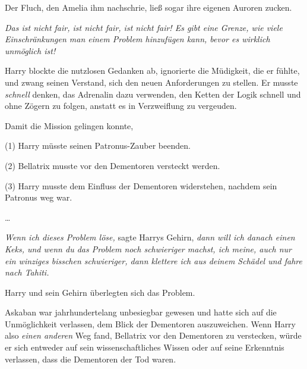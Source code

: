 Der Fluch, den Amelia ihm nachschrie, ließ sogar ihre eigenen Auroren zucken.

\later

\emph{Das ist nicht fair, ist nicht fair, ist nicht fair! Es gibt eine Grenze, wie viele Einschränkungen man einem Problem hinzufügen kann, bevor es wirklich unmöglich ist!}

Harry blockte die nutzlosen Gedanken ab, ignorierte die Müdigkeit, die er fühlte, und zwang seinen Verstand, sich den neuen Anforderungen zu stellen. Er musste \emph{schnell} denken, das Adrenalin dazu verwenden, den Ketten der Logik schnell und ohne Zögern zu folgen, anstatt es in Verzweiflung zu vergeuden.

Damit die Mission gelingen konnte,

(1) Harry müsste seinen Patronus-Zauber beenden.

(2) Bellatrix musste vor den Dementoren versteckt werden.

(3) Harry musste dem Einfluss der Dementoren widerstehen, nachdem sein Patronus weg war.

…

\emph{Wenn ich dieses Problem löse,} sagte Harrys Gehirn, \emph{dann will ich danach einen Keks, und wenn du das Problem noch schwieriger machst, ich meine, auch nur ein winziges bisschen schwieriger, dann klettere ich aus deinem Schädel und fahre nach Tahiti.}

Harry und sein Gehirn überlegten sich das Problem.

Askaban war jahrhundertelang unbesiegbar gewesen und hatte sich auf die Unmöglichkeit verlassen, dem Blick der Dementoren auszuweichen. Wenn Harry also \emph{einen anderen} Weg fand, Bellatrix vor den Dementoren zu verstecken, würde er sich entweder auf sein wissenschaftliches Wissen oder auf seine Erkenntnis verlassen, dass die Dementoren der Tod waren.

